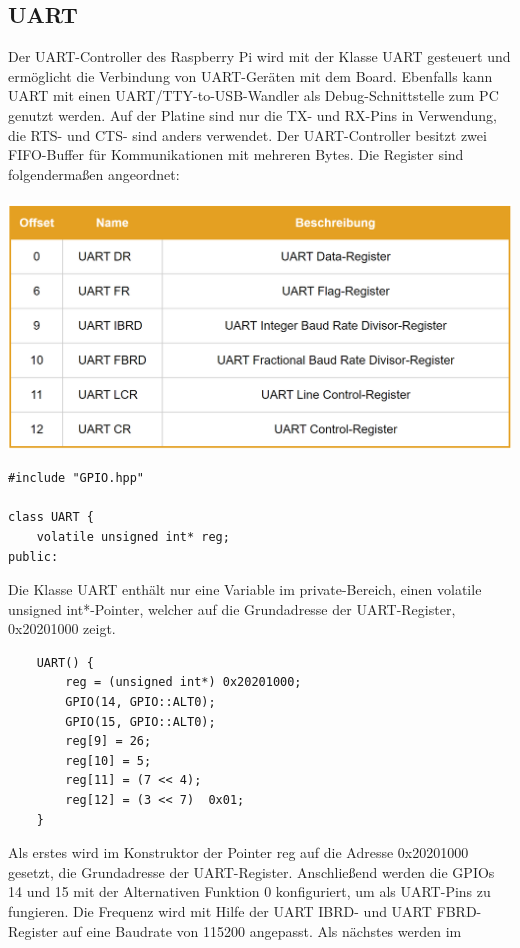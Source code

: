 \documentclass[12pt]{article}
\begin{document}
\subsection{UART} 
Der UART-Controller des Raspberry Pi wird mit der Klasse UART gesteuert und ermöglicht die Verbindung von UART-Geräten mit dem Board. Ebenfalls kann UART mit einen UART/TTY-to-USB-Wandler als Debug-Schnittstelle zum PC genutzt werden. Auf der Platine sind nur die TX- und RX-Pins in Verwendung, die RTS- und CTS- sind anders verwendet. Der UART-Controller besitzt zwei FIFO-Buffer für Kommunikationen mit mehreren Bytes. Die Register sind folgendermaßen angeordnet: \\\\
\includegraphics[width=\textwidth]{img/uart_table.png}
\begin{center}\end{center}
\begin{verbatim}
#include "GPIO.hpp"

class UART {
    volatile unsigned int* reg;
public:
\end{verbatim}
Die Klasse UART enthält nur eine Variable im private-Bereich, einen volatile unsigned int*-Pointer, welcher auf die Grundadresse der UART-Register, 0x20201000 zeigt.\\
\begin{verbatim}
    UART() {
        reg = (unsigned int*) 0x20201000;
        GPIO(14, GPIO::ALT0);
        GPIO(15, GPIO::ALT0);
        reg[9] = 26;
        reg[10] = 5; 
        reg[11] = (7 << 4);
        reg[12] = (3 << 7)  0x01;
    }
\end{verbatim}
 Als erstes wird im Konstruktor der Pointer reg auf die Adresse 0x20201000 gesetzt, die Grundadresse der UART-Register. Anschließend werden die GPIOs 14 und 15 mit der Alternativen Funktion 0 konfiguriert, um als UART-Pins zu fungieren. Die Frequenz wird mit Hilfe der UART IBRD- und UART FBRD-Register auf eine Baudrate von 115200 angepasst. Als nächstes werden im
\end{document}
